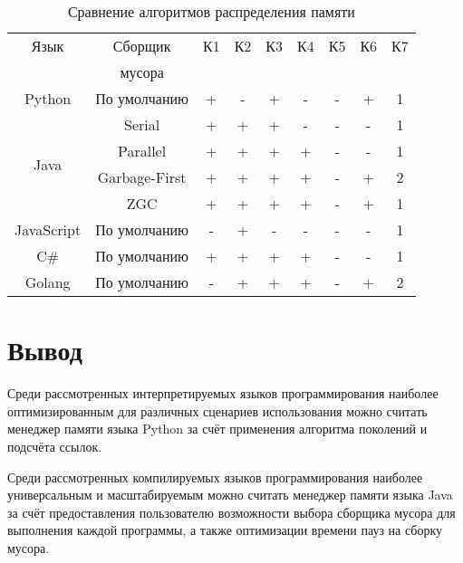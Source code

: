 \begin{table}[H]
	\centering
	\caption{Сравнение алгоритмов распределения памяти}
	\label{tab:compare}
	\begin{tabular}{|c|c|c|c|c|c|c|c|c|}
		\hline
		Язык & Сборщик & К1 & К2 & К3 & К4 & К5 & К6 & К7 \\
		 & мусора &  &  &  &  &  &  &  \\ \hline
		Python & По умолчанию 			& + & - & + & - & - & + & 1 \\ \hline
		\multirow{4}{*}{Java} & Serial 	& + & + & + & - & - & - & 1 \\ \cline{2-9}
		 & Parallel 					& + & + & + & + & - & - & 1 \\ \cline{2-9}
		 & Garbage-First 				& + & + & + & + & - & + & 2 \\ \cline{2-9}
		 & ZGC 							& + & + & + & + & - & + & 1 \\ \hline
		JavaScript & По умолчанию 		& - & + & - & - & - & - & 1 \\ \hline
		C\# & По умолчанию 				& + & + & + & + & - & - & 1 \\ \hline
		Golang & По умолчанию 			& - & + & + & + & - & + & 2 \\ \hline
	\end{tabular}
\end{table}



\section{Вывод}



Среди рассмотренных интерпретируемых языков программирования наиболее оптимизированным для различных сценариев использования можно считать менеджер памяти языка Python за счёт применения алгоритма поколений и подсчёта ссылок.

Среди рассмотренных компилируемых языков программирования наиболее универсальным и масштабируемым можно считать менеджер памяти языка Java за счёт предоставления пользователю возможности выбора сборщика мусора для выполнения каждой программы, а также оптимизации времени пауз на сборку мусора.
